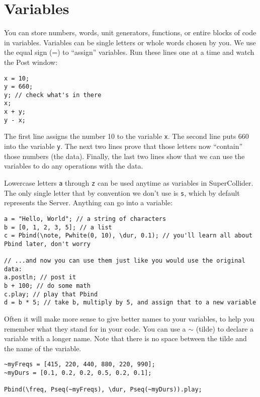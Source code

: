 \section{Variables}
\label{sec:variables}

You can store numbers, words, unit generators, functions, or entire blocks of code in variables. Variables can be single letters or whole words chosen by you. We use the equal sign (=) to ``assign'' variables. Run these lines one at a time and watch the Post window:

 
\begin{lstlisting}[style=SuperCollider-IDE, basicstyle=\scttfamily\footnotesize]
x = 10;
y = 660;
y; // check what's in there
x;
x + y;
y - x;
\end{lstlisting}
 

The first line assigns the number 10 to the variable \texttt{x}. The second line puts 660 into the variable \texttt{y}. The next two lines prove that those letters now ``contain'' those numbers (the data). Finally, the last two lines show that we can use the variables to do any operations with the data.

Lowercase letters \texttt{a} through \texttt{z} can be used anytime as variables in SuperCollider. The only single letter that by convention we don't use is \texttt{s}, which by default represents the Server. Anything can go into a variable:
 
\begin{lstlisting}[style=SuperCollider-IDE, basicstyle=\scttfamily\footnotesize]
a = "Hello, World"; // a string of characters
b = [0, 1, 2, 3, 5]; // a list
c = Pbind(\note, Pwhite(0, 10), \dur, 0.1); // you'll learn all about Pbind later, don't worry

// ...and now you can use them just like you would use the original data:
a.postln; // post it
b + 100; // do some math
c.play; // play that Pbind
d = b * 5; // take b, multiply by 5, and assign that to a new variable
\end{lstlisting}

Often it will make more sense to give better names to your variables, to help you remember what they stand for in your code. You can use a $\sim$ (tilde) to declare a variable with a longer name. Note that there is no space between the tilde and the name of the variable.

\begin{lstlisting}[style=SuperCollider-IDE, basicstyle=\scttfamily\footnotesize]
~myFreqs = [415, 220, 440, 880, 220, 990];
~myDurs = [0.1, 0.2, 0.2, 0.5, 0.2, 0.1];

Pbind(\freq, Pseq(~myFreqs), \dur, Pseq(~myDurs)).play;
\end{lstlisting}
 

